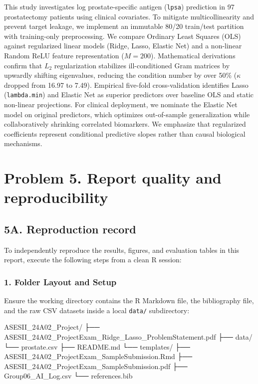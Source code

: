 \documentclass[
  11pt,
]{article}
\newenvironment{Shaded}{\begin{snugshade}}{\end{snugshade}}
\newcommand{\NormalTok}[1]{#1}
\begin{document}
This study investigates log prostate-specific antigen (\texttt{lpsa})
prediction in 97 prostatectomy patients using clinical covariates. To
mitigate multicollinearity and prevent target leakage, we implement an
immutable 80/20 train/test partition with training-only preprocessing.
We compare Ordinary Least Squares (OLS) against regularized linear
models (Ridge, Lasso, Elastic Net) and a non-linear Random ReLU feature
representation (\(M=200\)). Mathematical derivations confirm that
\(L_2\) regularization stabilizes ill-conditioned Gram matrices by
upwardly shifting eigenvalues, reducing the condition number by over
50\% (\(\kappa\) dropped from 16.97 to 7.49). Empirical five-fold
cross-validation identifies Lasso (\texttt{lambda.min}) and Elastic Net
as superior predictors over baseline OLS and static non-linear
projections. For clinical deployment, we nominate the Elastic Net model
on original predictors, which optimizes out-of-sample generalization
while collaboratively shrinking correlated biomarkers. We emphasize that
regularized coefficients represent conditional predictive slopes rather
than causal biological mechanisms.

\section{Problem 5. Report quality and
reproducibility}\label{problem-5.-report-quality-and-reproducibility}

\subsection{5A. Reproduction record}\label{a.-reproduction-record}

To independently reproduce the results, figures, and evaluation tables
in this report, execute the following steps from a clean R session:

\subsubsection{1. Folder Layout and
Setup}\label{folder-layout-and-setup}

Ensure the working directory contains the R Markdown file, the
bibliography file, and the raw CSV datasets inside a local
\texttt{data/} subdirectory:

\begin{Shaded}
\begin{Highlighting}[]
\NormalTok{ASESII\_24A02\_Project/}
\NormalTok{├── ASESII\_24A02\_ProjectExam\_Ridge\_Lasso\_ProblemStatement.pdf}
\NormalTok{├── data/}
\NormalTok{    └── prostate.csv}
\NormalTok{├── README.md     }
\NormalTok{└── templates/}
\NormalTok{    ├── ASESII\_24A02\_ProjectExam\_SampleSubmission.Rmd        }
\NormalTok{    ├── ASESII\_24A02\_ProjectExam\_SampleSubmission.pdf}
\NormalTok{    ├── Group06\_AI\_Log.csv       }
\NormalTok{    └── references.bib        }
\end{Highlighting}
\end{Shaded}
\end{document}
